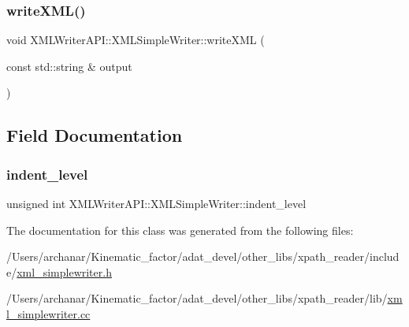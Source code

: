 \mbox{\label{classXMLWriterAPI_1_1XMLSimpleWriter_a83601254ff259af02e51d627b4fd4b1b}} 
\subsubsection{\texorpdfstring{writeXML()}{writeXML()}\hspace{0.1cm}{\footnotesize\ttfamily [2/2]}}
{\footnotesize\ttfamily void X\+M\+L\+Writer\+A\+P\+I\+::\+X\+M\+L\+Simple\+Writer\+::write\+X\+ML (\begin{DoxyParamCaption}\item[{const std\+::string \&}]{output }\end{DoxyParamCaption})}



\subsection{Field Documentation}
\mbox{\label{classXMLWriterAPI_1_1XMLSimpleWriter_a61ccdacc4406db6a4a78c77a16f150da}} 
\subsubsection{\texorpdfstring{indent\_level}{indent\_level}}
{\footnotesize\ttfamily unsigned int X\+M\+L\+Writer\+A\+P\+I\+::\+X\+M\+L\+Simple\+Writer\+::indent\+\_\+level\hspace{0.3cm}{\ttfamily [protected]}}



The documentation for this class was generated from the following files\+:\begin{DoxyCompactItemize}
\item 
/\+Users/archanar/\+Kinematic\+\_\+factor/adat\+\_\+devel/other\+\_\+libs/xpath\+\_\+reader/include/\mbox{\hyperlink{other__libs_2xpath__reader_2include_2xml__simplewriter_8h}{xml\+\_\+simplewriter.\+h}}\item 
/\+Users/archanar/\+Kinematic\+\_\+factor/adat\+\_\+devel/other\+\_\+libs/xpath\+\_\+reader/lib/\mbox{\hyperlink{xml__simplewriter_8cc}{xml\+\_\+simplewriter.\+cc}}\end{DoxyCompactItemize}
